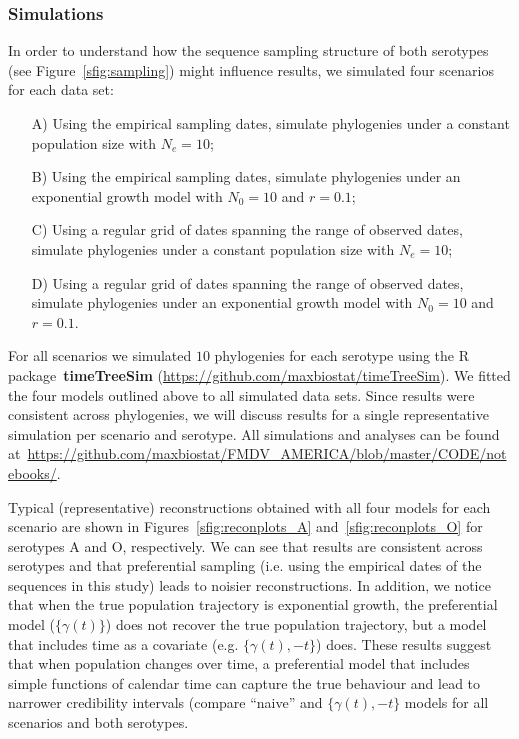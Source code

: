 \documentclass[a4paper,10pt]{article}
\begin{document}
 
\subsubsection*{Simulations}

In order to understand how the sequence sampling structure of both serotypes (see Figure~\ref{sfig:sampling}) might influence results, we simulated four scenarios for each data set:
\begin{itemize}
 \item[A)] Using the empirical sampling dates, simulate phylogenies under a constant population size with $N_e = 10$;
 \item[B)] Using the empirical sampling dates, simulate phylogenies under an exponential growth model with $N_0 = 10$ and $r = 0.1$;
 \item[C)] Using a regular grid of dates spanning the range of observed dates, simulate phylogenies under a constant population size with $N_e = 10$;
 \item[D)]  Using a regular grid of dates spanning the range of observed dates, simulate phylogenies under an exponential growth model with $N_0 = 10$ and $r = 0.1$.
\end{itemize}
For all scenarios we simulated $10$ phylogenies for each serotype using the R package~\textbf{timeTreeSim} (\url{https://github.com/maxbiostat/timeTreeSim}).
We fitted the four models outlined above to all simulated data sets.
Since results were consistent across phylogenies, we will discuss results for a single representative simulation per scenario and serotype.
All simulations and analyses can be found at~\url{https://github.com/maxbiostat/FMDV_AMERICA/blob/master/CODE/notebooks/}.

Typical (representative) reconstructions obtained with all four models for each scenario are shown in Figures~\ref{sfig:reconplots_A} and~\ref{sfig:reconplots_O} for serotypes A and O, respectively.
We can see that results are consistent across serotypes and that preferential sampling (i.e. using the empirical dates of the sequences in this study) leads to noisier reconstructions.
In addition, we notice that when the true population trajectory is exponential growth, the preferential model ($\{\gamma(t)\}$) does not recover the true population trajectory, but a model that includes time as a covariate (e.g. $\{\gamma(t), -t\}$) does.
These results suggest that when population changes over time, a preferential model that includes simple functions of calendar time can capture the true behaviour and lead to narrower credibility intervals (compare ``naive'' and $\{\gamma(t), -t\}$ models for all scenarios and both serotypes.
\end{document}
